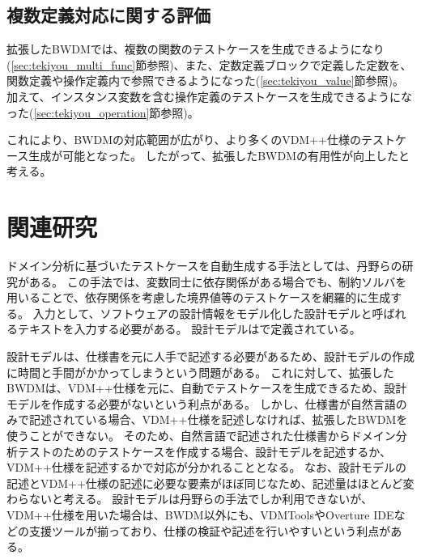 \documentclass[uplatex, report, a4j, 10pt]{jsbook}
\begin{document}
\subsection{複数定義対応に関する評価}
拡張したBWDMでは、複数の関数のテストケースを生成できるようになり(\ref{sec:tekiyou_multi_func}節参照)、また、定数定義ブロックで定義した定数を、関数定義や操作定義内で参照できるようになった(\ref{sec:tekiyou_value}節参照)。
加えて、インスタンス変数を含む操作定義のテストケースを生成できるようになった(\ref{sec:tekiyou_operation}節参照)。

これにより、BWDMの対応範囲が広がり、より多くのVDM++仕様のテストケース生成が可能となった。
したがって、拡張したBWDMの有用性が向上したと考える。


\section{関連研究}
\begin{comment}
\begin{figure}[t]
  \begin{center}
    \texttt{[image: image/model\_park.png]}
    \caption{設計モデルの例(遊園地チケット購入機能)}
    \ecaption{Example of design model (amusement park ticket discount function)}
    \label{fig:model_park}
  \end{center}
\end{figure}
\end{comment}

ドメイン分析に基づいたテストケースを自動生成する手法としては、丹野らの研究\cite{sekkeiModel}がある。
この手法では、変数同士に依存関係がある場合でも、制約ソルバ\cite{sat}を用いることで、依存関係を考慮した境界値等のテストケースを網羅的に生成する。
入力として、ソフトウェアの設計情報をモデル化した設計モデルと呼ばれるテキストを入力する必要がある。
設計モデルは\cite{sekkeiModel}で定義されている。

設計モデルは、仕様書を元に人手で記述する必要があるため、設計モデルの作成に時間と手間がかかってしまうという問題がある。
これに対して、拡張したBWDMは、VDM++仕様を元に、自動でテストケースを生成できるため、設計モデルを作成する必要がないという利点がある。
しかし、仕様書が自然言語のみで記述されている場合、VDM++仕様を記述しなければ、拡張したBWDMを使うことができない。
そのため、自然言語で記述された仕様書からドメイン分析テストのためのテストケースを作成する場合、設計モデルを記述するか、VDM++仕様を記述するかで対応が分かれることとなる。
なお、設計モデルの記述とVDM++仕様の記述に必要な要素がほぼ同じなため、記述量はほとんど変わらないと考える。
設計モデルは丹野らの手法でしか利用できないが、VDM++仕様を用いた場合は、BWDM以外にも、VDMTools\cite{vdmtools}やOverture IDE\cite{overture}などの支援ツールが揃っており、仕様の検証や記述を行いやすいという利点がある。
\end{document}
